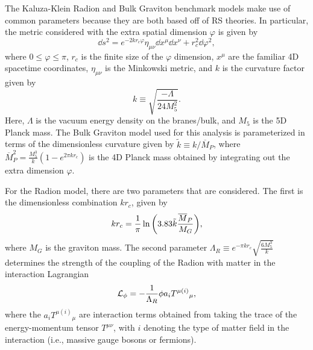 The Kaluza-Klein Radion and Bulk Graviton benchmark models make use of common parameters because they are both based off of RS theories.
In particular, the metric considered with the extra spatial dimension $\varphi$ is given by~\cite{carvalho2018gravity}
\begin{equation}
  \dd{s}^2=e^{-2kr_c\varphi}\eta_{\mu\nu}\dd{x}^\mu\dd{x}^\nu+r_c^2\dd{\varphi}^2,
\end{equation}
where $0\leq\varphi\leq\pi$, $r_c$ is the finite size of the $\varphi$ dimension, $x^\mu$ are the familiar 4D spacetime coordinates, $\eta_{\mu\nu}$ is the Minkowski metric, and $k$ is the curvature factor given by
\begin{equation}
  k\equiv\sqrt{\frac{-\Lambda}{24M_5^2}}.
\end{equation}
Here, $\Lambda$ is the vacuum energy density on the branes/bulk, and $M_5$ is the 5D Planck mass.
The Bulk Graviton model used for this analysis is parameterized in terms of the dimensionless curvature given by $\tilde{k}\equiv{k/\overline{M}_P}$, where $\overline{M}_P^2=\frac{M_5^3}{k}(1-e^{2\pi kr_c})$ is the 4D Planck mass obtained by integrating out the extra dimension $\varphi$.

For the Radion model, there are two parameters that are considered.
The first is the dimensionless combination $kr_c$, given by
\begin{equation}
  kr_c=\frac{1}{\pi}\ln\pqty{3.83\tilde{k}\frac{\overline{M}_P}{M_G}},
\end{equation}
where $M_G$ is the graviton mass.
The second parameter $\Lambda_R\equiv e^{-\pi kr_c}\sqrt{\frac{6M_5^3}{k}}$ determines the strength of the coupling of the Radion with matter in the interaction Lagrangian
\begin{equation}
  \mathcal{L}_\phi=-\frac{1}{\Lambda_R}\phi a_iT^{\mu(i)}{}_\mu,
\end{equation}
where the $a_iT^{\mu(i)}{}_\mu$ are interaction terms obtained from taking the trace of the energy-momentum tensor $T^{\mu\nu}$, with $i$ denoting the type of matter field in the interaction (i.e., massive gauge bosons or fermions).

